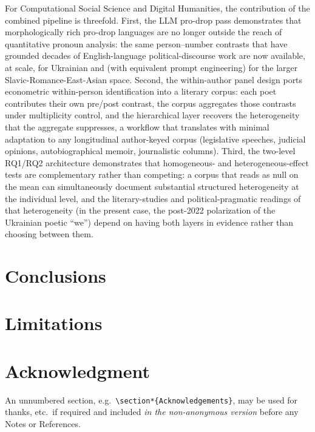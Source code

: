 \documentclass[12pt]{interact}
\theoremstyle{plain}%
\theoremstyle{definition}
\theoremstyle{remark}
\begin{document}
For Computational Social Science and Digital Humanities, the contribution of the combined pipeline is threefold. First, the LLM pro-drop pass demonstrates that morphologically rich pro-drop languages are no longer outside the reach of quantitative pronoun analysis: the same person--number contrasts that have grounded decades of English-language political-discourse work are now available, at scale, for Ukrainian and (with equivalent prompt engineering) for the larger Slavic-Romance-East-Asian space. Second, the within-author panel design ports econometric within-person identification into a literary corpus: each poet contributes their own pre/post contrast, the corpus aggregates those contrasts under multiplicity control, and the hierarchical layer recovers the heterogeneity that the aggregate suppresses, a workflow that translates with minimal adaptation to any longitudinal author-keyed corpus (legislative speeches, judicial opinions, autobiographical memoir, journalistic columns). Third, the two-level RQ1/RQ2 architecture demonstrates that homogeneous- and heterogeneous-effect tests are complementary rather than competing: a corpus that reads as null on the mean can simultaneously document substantial structured heterogeneity at the individual level, and the literary-studies and political-pragmatic readings of that heterogeneity (in the present case, the post-2022 polarization of the Ukrainian poetic ``we'') depend on having both layers in evidence rather than choosing between them.

\section{Conclusions}

\section{Limitations}

\section*{Acknowledgment}

An unnumbered section, e.g.\ \verb"\section*{Acknowledgements}", may be used for thanks, etc.\ if required and included \emph{in the non-anonymous version} before any Notes or References.
\end{document}
